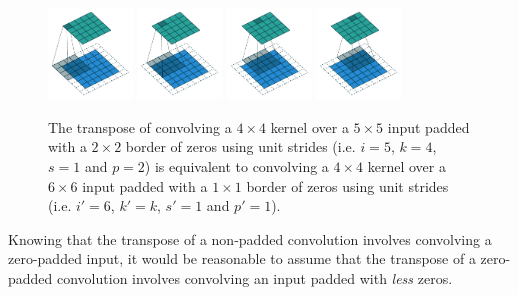 \documentclass{article}
\begin{document}
\begin{figure}[h]
    \centering
    \includegraphics[width=0.2\textwidth]
        {pdf/arbitrary_padding_no_strides_transposed_00.pdf}
    \includegraphics[width=0.2\textwidth]
        {pdf/arbitrary_padding_no_strides_transposed_01.pdf}
    \includegraphics[width=0.2\textwidth]
        {pdf/arbitrary_padding_no_strides_transposed_02.pdf}
    \includegraphics[width=0.2\textwidth]
        {pdf/arbitrary_padding_no_strides_transposed_03.pdf}
    \caption{\label{fig:arbitrary_padding_no_strides_transposed} The transpose
        of convolving a $4 \times 4$ kernel over a $5 \times 5$ input padded
        with a $2 \times 2$ border of zeros using unit strides (i.e. $i = 5$,
        $k = 4$, $s = 1$ and $p = 2$) is equivalent to convolving a $4 \times 4$
        kernel over a $6 \times 6$ input padded with a $1 \times 1$ border of
        zeros using unit strides (i.e. $i' = 6$, $k' = k$, $s' = 1$ and $p' =
        1$).}
\end{figure}

Knowing that the transpose of a non-padded convolution involves convolving a
zero-padded input, it would be reasonable to assume that the transpose of a
zero-padded convolution involves convolving an input padded with {\em less}
zeros.
\end{document}
